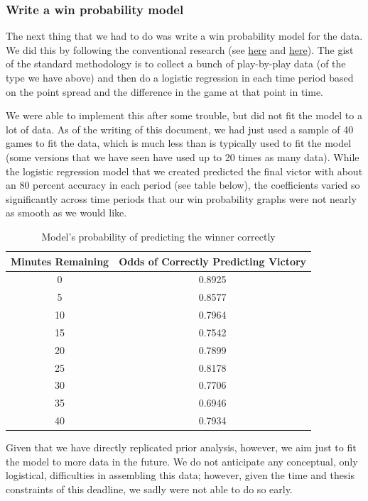 \documentclass[12pt]{article}
\begin{document}
\subsubsection*{Write a win probability model}

The next thing that we had to do was write a win probability model for the data. We did this by following the conventional research (see \href{http://fivethirtyeight.com/features/how-fivethirtyeight-is-forecasting-the-2016-ncaa-tournament/}{here} and \href{http://wagesofwins.com/2009/03/05/modeling-win-probability-for-a-college-basketball-game-a-guest-post-from-brian-burke/}{here}). The gist of the standard methodology is to collect a bunch of play-by-play data (of the type we have above) and then do a logistic regression in each time period based on the point spread and the difference in the game at that point in time.

We were able to implement this after some trouble, but did not fit the model to a lot of data. As of the writing of this document, we had just used a sample of 40 games to fit the data, which is much less than is typically used to fit the model (some versions that we have seen have used up to 20 times as many data). While the logistic regression model that we created predicted the final victor with about an 80 percent accuracy in each period (see table below), the coefficients varied so significantly across time periods that our win probability graphs were not nearly as smooth as we would like. 

\begin{table}[H] 
\centering  
\caption{Model's probability of predicting the winner correctly}   
\begin{tabular}{c c}
\hline \hline
Minutes Remaining & Odds of Correctly Predicting Victory \\ [0.5ex]
\hline
0 & 0.8925 \\
5 & 0.8577 \\
10 & 0.7964 \\
15 & 0.7542 \\
20 & 0.7899 \\ 
25 & 0.8178 \\ 
30 & 0.7706 \\ 
35 & 0.6946 \\ 
40 & 0.7934 \\
\hline
\end{tabular}
\end{table}

Given that we have directly replicated prior analysis, however, we aim just to fit the model to more data in the future. We do not anticipate any conceptual, only logistical, difficulties in assembling this data; however, given the time and thesis constraints of this deadline, we sadly were not able to do so early. 
\end{document}
